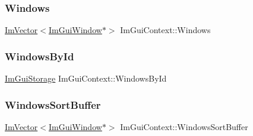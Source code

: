 \subsubsection{\texorpdfstring{Windows}{Windows}}
{\footnotesize\ttfamily \hyperlink{class_im_vector}{Im\+Vector}$<$\hyperlink{struct_im_gui_window}{Im\+Gui\+Window}$\ast$$>$ Im\+Gui\+Context\+::\+Windows}

\hypertarget{struct_im_gui_context_adc1e46e1c1582a0f0eb74d957efedf98}{}\label{struct_im_gui_context_adc1e46e1c1582a0f0eb74d957efedf98} 
\subsubsection{\texorpdfstring{Windows\+By\+Id}{WindowsById}}
{\footnotesize\ttfamily \hyperlink{struct_im_gui_storage}{Im\+Gui\+Storage} Im\+Gui\+Context\+::\+Windows\+By\+Id}

\hypertarget{struct_im_gui_context_af33de778de28b057fa7a42e4cbe0017a}{}\label{struct_im_gui_context_af33de778de28b057fa7a42e4cbe0017a} 
\subsubsection{\texorpdfstring{Windows\+Sort\+Buffer}{WindowsSortBuffer}}
{\footnotesize\ttfamily \hyperlink{class_im_vector}{Im\+Vector}$<$\hyperlink{struct_im_gui_window}{Im\+Gui\+Window}$\ast$$>$ Im\+Gui\+Context\+::\+Windows\+Sort\+Buffer}

